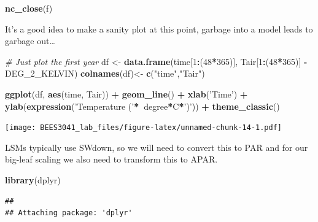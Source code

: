 \documentclass[]{article}
\newenvironment{Shaded}{\begin{snugshade}}{\end{snugshade}}
\newcommand{\CommentTok}[1]{\textcolor[rgb]{0.56,0.35,0.01}{\textit{#1}}}
\newcommand{\DecValTok}[1]{\textcolor[rgb]{0.00,0.00,0.81}{#1}}
\newcommand{\ErrorTok}[1]{\textcolor[rgb]{0.64,0.00,0.00}{\textbf{#1}}}
\newcommand{\KeywordTok}[1]{\textcolor[rgb]{0.13,0.29,0.53}{\textbf{#1}}}
\newcommand{\NormalTok}[1]{#1}
\newcommand{\OperatorTok}[1]{\textcolor[rgb]{0.81,0.36,0.00}{\textbf{#1}}}
\newcommand{\StringTok}[1]{\textcolor[rgb]{0.31,0.60,0.02}{#1}}
\begin{document}
\begin{Shaded}
\begin{Highlighting}[]
\KeywordTok{nc_close}\NormalTok{(f) }
\end{Highlighting}
\end{Shaded}

It's a good idea to make a sanity plot at this point, garbage into a
model leads to garbage out\ldots{}

\begin{Shaded}
\begin{Highlighting}[]
\CommentTok{# Just plot the first year}
\NormalTok{df <-}\StringTok{ }\KeywordTok{data.frame}\NormalTok{(time[}\DecValTok{1}\OperatorTok{:}\NormalTok{(}\DecValTok{48}\OperatorTok{*}\DecValTok{365}\NormalTok{)], Tair[}\DecValTok{1}\OperatorTok{:}\NormalTok{(}\DecValTok{48}\OperatorTok{*}\DecValTok{365}\NormalTok{)] }\OperatorTok{-}\StringTok{ }\NormalTok{DEG_}\DecValTok{2}\NormalTok{_KELVIN)}
\KeywordTok{colnames}\NormalTok{(df)<-}\StringTok{ }\KeywordTok{c}\NormalTok{(}\StringTok{"time"}\NormalTok{,}\StringTok{"Tair"}\NormalTok{) }

\KeywordTok{ggplot}\NormalTok{(df, }\KeywordTok{aes}\NormalTok{(time, Tair)) }\OperatorTok{+}
\StringTok{  }\KeywordTok{geom_line}\NormalTok{() }\OperatorTok{+}
\StringTok{  }\KeywordTok{xlab}\NormalTok{(}\StringTok{'Time'}\NormalTok{) }\OperatorTok{+}\StringTok{ }
\StringTok{  }\KeywordTok{ylab}\NormalTok{(}\KeywordTok{expression}\NormalTok{(}\StringTok{'Temperature ('}\OperatorTok{*}\ErrorTok{~}\NormalTok{degree}\OperatorTok{*}\NormalTok{C}\OperatorTok{*}\StringTok{')'}\NormalTok{)) }\OperatorTok{+}\StringTok{ }
\StringTok{  }\KeywordTok{theme_classic}\NormalTok{()}
\end{Highlighting}
\end{Shaded}

\texttt{[image: BEES3041\_lab\_files/figure-latex/unnamed-chunk-14-1.pdf]}

LSMs typically use SWdown, so we will need to convert this to PAR and
for our big-leaf scaling we also need to transform this to APAR.

\begin{Shaded}
\begin{Highlighting}[]
\KeywordTok{library}\NormalTok{(dplyr)}
\end{Highlighting}
\end{Shaded}

\begin{verbatim}
## 
## Attaching package: 'dplyr'
\end{verbatim}
\end{document}
